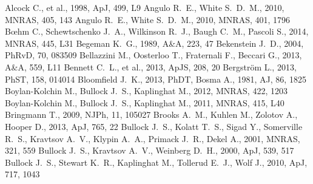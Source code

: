 \documentclass[a4wide,12pt]{book}
\begin{document}
{\begin{thebibliography}{}
Alcock C., et al., 1998, ApJ, 499, L9 
 Angulo R.~E., White S.~D.~M., 2010, MNRAS, 405, 143 
 Angulo R.~E., White S.~D.~M., 2010, MNRAS, 401, 1796 
 B{\oe}hm C., Schewtschenko J.~A., 
Wilkinson R.~J., Baugh C.~M., Pascoli S., 2014, MNRAS, 445, L31 
 Begeman K.~G., 1989, A\&A, 223, 47 
Bekenstein J.~D., 2004, PhRvD, 70, 083509 
 Bellazzini M., Oosterloo T., Fraternali F., Beccari G., 2013, A\&A, 559, L11 
 Bennett C.~L., et al., 2013, ApJS, 208, 20 
Bergstr{\"o}m L., 2013, PhST, 158, 014014
Bloomfield J.~K., 2013, PhDT, 
 Bosma 
A., 1981, AJ, 86, 1825 
 Boylan-Kolchin M., Bullock J.~S., Kaplinghat M., 2012, MNRAS, 422, 1203 
 Boylan-Kolchin M., Bullock J.~S., Kaplinghat M., 2011, MNRAS, 415, L40 
Bringmann T., 2009, NJPh, 11, 105027 
Brooks A.~M., Kuhlen M., Zolotov A., Hooper D., 2013, ApJ, 765, 22 
 Bullock J.~S., Kolatt T.~S., Sigad Y., 
Somerville R.~S., Kravtsov A.~V., Klypin A.~A., Primack J.~R., Dekel A., 
2001, MNRAS, 321, 559 
 Bullock J.~S., Kravtsov A.~V., Weinberg D.~H., 2000, ApJ, 539, 517 
 Bullock J.~S., Stewart K.~R., Kaplinghat 
M., Tollerud E.~J., Wolf J., 2010, ApJ, 717, 1043 

\end{thebibliography}}
\end{document}
